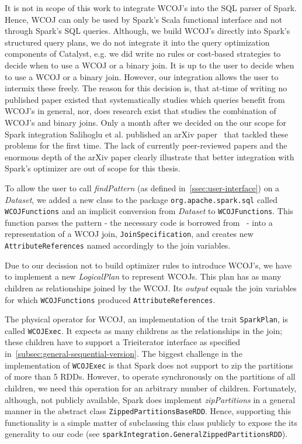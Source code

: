It is not in scope of this work to integrate WCOJ's into the SQL parser of Spark.
Hence, WCOJ can only be used by Spark's Scala functional interface and not through Spark's SQL queries.
Although, we build WCOJ's directly into Spark's structured query plans, we do not integrate it into the query optimization components of
Catalyst, e.g. we did write no rules or cost-based strategies to decide when to use a WCOJ or a binary join.
It is up to the user to decide when to use a WCOJ or a binary join.
However, our integration allows the user to intermix these freely.
The reason for this decision is, that at-time of writing no published paper existed that systematically studies which queries benefit from
WCOJ's in general, nor, does research exist that studies the combination of WCOJ's and binary joins.
Only a month after we decided on the our scope for Spark integration Salihoglu et al. published an arXiv paper~\cite{mhedhbi2019} that
tackled these problems for the first time.
The lack of currently peer-reviewed papers and the enormous depth of the arXiv paper clearly illustrate that better integration with
Spark's optimizer are out of scope for this thesis.

To allow the user to call \textit{findPattern} (as defined in~\cref{ssec:user-interface}) on a \textit{Dataset}, we added a new class
to the package \texttt{org.apache.spark.sql} called \texttt{WCOJFunctions} and an implicit conversion from \textit{Dataset} to
\texttt{WCOJFunctions}.
This function parses the pattern - the necessary code is borrowed from~\cite{graphframe} - into a representation of a WCOJ join,
\texttt{JoinSpecification}, and creates new \texttt{AttributeReferences} named accordingly to the join variables.

Due to our decission not to build optimizer rules to introduce WCOJ's, we have to implement a new \textit{LogicalPlan} to represent WCOJs.
This plan has as many children as relationships joined by the WCOJ.
Its \textit{output} equals the join variables for which \texttt{WCOJFunctions} produced \texttt{AttributeReferences}.

The physical operator for WCOJ, an implementation of the trait \texttt{SparkPlan}, is called \texttt{WCOJExec}.
It expects as many childrens as the relationships in the join;
these children have to support a Trieiterator interface as specified in~\cref{subsec:general-sequential-version}.
The biggest challenge in the implementation of \texttt{WCOJExec} is that Spark does not support to zip the partitions of more than 5 RDDs.
However, to operate synchronously on the partitions of all children, we need this operation for an arbitrary number of children.
Fortunately, although, not publicly available, Spark does implement \textit{zipPartitions} in a general manner in
the abstract class \texttt{ZippedPartitionsBaseRDD}.
Hence, supporting this functionality is a simple matter of subclassing this class publicly to expose the its generality to our code (see
\texttt{sparkIntegration.GeneralZippedPartitionsRDD}).

